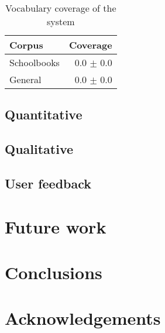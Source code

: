 \documentclass[a4paper,11pt,twocolumn]{article}
\begin{document}
\begin{table}
  \begin{center}
    \begin{tabular}{|l|r|}
      \hline
      \textbf{Corpus} & \textbf{Coverage}  \\
      \hline
      Schoolbooks     & 0.0 $\pm$ 0.0 \\
      General         & 0.0 $\pm$ 0.0 \\
      \hline
    \end{tabular}
    \label{table:coverage}
    \caption{Vocabulary coverage of the system}
  \end{center}
\end{table}

\subsection{Quantitative}

\subsection{Qualitative}

\subsection{User feedback}

\section{Future work}

\section{Conclusions}

\section*{Acknowledgements}



\end{document}

